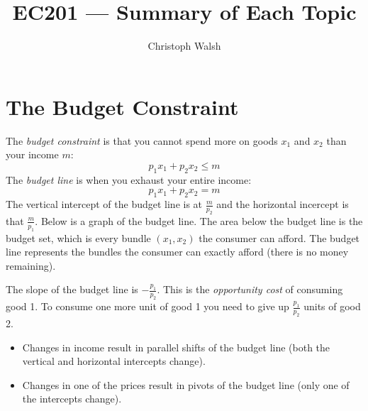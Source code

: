 \documentclass{article}
\title{EC201 --- Summary of Each Topic}
\author{Christoph Walsh}
\begin{document}
\maketitle
\section{The Budget Constraint}
The \emph{budget constraint} is that you cannot spend more on goods $x_1$ and $x_2$ than your income $m$:
\[
  p_1x_1 + p_2x_2 \leq m
\]
The \emph{budget line} is when you exhaust your entire income:
\[
  p_1x_1 + p_2x_2 = m
\]
The vertical intercept of the budget line is at $\frac{m}{p_2}$ and the horizontal incercept is that $\frac{m}{p_1}$. Below is a graph of the budget line. The area below the budget line is the budget set, which is every bundle $\left( x_1,x_2 \right)$ the consumer can afford. The budget line represents the bundles the consumer can exactly afford (there is no money remaining).
\begin{center}
\end{center}
The slope of the budget line is $-\frac{p_1}{p_2}$. This is the \emph{opportunity cost} of consuming good 1. To consume one more unit of good 1 you need to give up $\frac{p_1}{p_2}$ units of good 2.
\begin{itemize}
  \item Changes in income result in parallel shifts of the budget line (both the vertical and horizontal intercepts change).
  \item Changes in one of the prices result in pivots of the budget line (only one of the intercepts change).
\end{itemize}
\end{document}
